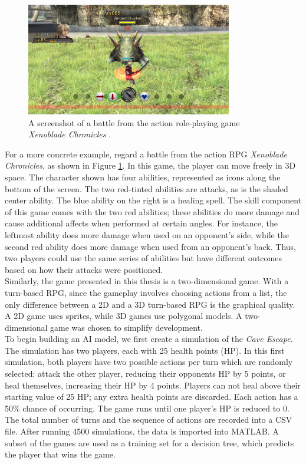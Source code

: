 \begin{figure}[H]
  \centering
  \includegraphics[width=9cm]{figures/Xenoblade.png}
  \caption{A screenshot of a battle from the action role-playing game \textit{Xenoblade Chronicles} \cite{xenoblade10}.}
  \label{fig:Xenoblade}
\end{figure}

For a more concrete example, regard a battle from the action RPG \textit{Xenoblade Chronicles}, as shown in Figure \ref{fig:Xenoblade}. In this game, the player can move freely in 3D space. The character shown has four abilities, represented as icons along the bottom of the screen. The two red-tinted abilities are attacks, as is the shaded center ability. The blue ability on the right is a healing spell. The skill component of this game comes with the two red abilities; these abilities do more damage and cause additional affects when performed at certain angles. For instance, the leftmost ability does more damage when used on an opponent's side, while the second red ability does more damage when used from an opponent's back. Thus, two players could use the same series of abilities but have different outcomes based on how their attacks were positioned.\\

Similarly, the game presented in this thesis is a two-dimensional game. With a turn-based RPG, since the gameplay involves choosing actions from a list, the only difference between a 2D and a 3D turn-based RPG is the graphical quality. A 2D game uses sprites, while 3D games use polygonal models. A two-dimensional game was chosen to simplify development.\\

To begin building an AI model, we first create a simulation of the \textit{Cave Escape}. The simulation has two players, each with 25 health points (HP). In this first simulation, both players have two possible actions per turn which are randomly selected: attack the other player, reducing their opponents HP by 5 points, or heal themselves, increasing their HP by 4 points. Players can not heal above their starting value of 25 HP; any extra health points are discarded. Each action has a 50\% chance of occurring. The game runs until one player's HP is reduced to 0. The total number of turns and the sequence of actions are recorded into a CSV file. After running 4500 simulations, the data is imported into MATLAB. A subset of the games are used as a training set for a decision tree, which predicts the player that wins the game.\\

